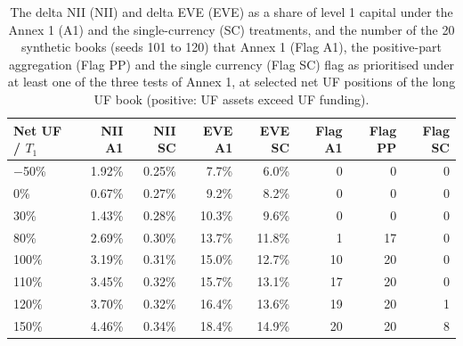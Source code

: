 \begin{table}[htbp]
\centering
\footnotesize
\setlength{\tabcolsep}{3.5pt}
\caption{The delta NII (NII) and delta EVE (EVE) as a share of level 1 capital under the Annex 1 (A1) and the single-currency (SC) treatments, and the number of the 20 synthetic books (seeds 101 to 120) that Annex 1 (Flag A1), the positive-part aggregation (Flag PP) and the single currency (Flag SC) flag as prioritised under at least one of the three tests of Annex 1, at selected net UF positions of the long UF book (positive: UF assets exceed UF funding).}
\label{tab:sweep}
\begin{tabular}{lrrrrrrr}
\toprule
Net UF / $T_1$ & NII A1 & NII SC & EVE A1 & EVE SC & Flag A1 & Flag PP & Flag SC \\
\midrule
$-$50\% & 1.92\% & 0.25\% & 7.7\% & 6.0\% & 0 & 0 & 0 \\
0\% & 0.67\% & 0.27\% & 9.2\% & 8.2\% & 0 & 0 & 0 \\
30\% & 1.43\% & 0.28\% & 10.3\% & 9.6\% & 0 & 0 & 0 \\
80\% & 2.69\% & 0.30\% & 13.7\% & 11.8\% & 1 & 17 & 0 \\
100\% & 3.19\% & 0.31\% & 15.0\% & 12.7\% & 10 & 20 & 0 \\
110\% & 3.45\% & 0.32\% & 15.7\% & 13.1\% & 17 & 20 & 0 \\
120\% & 3.70\% & 0.32\% & 16.4\% & 13.6\% & 19 & 20 & 1 \\
150\% & 4.46\% & 0.34\% & 18.4\% & 14.9\% & 20 & 20 & 8 \\
\bottomrule
\end{tabular}
\end{table}
